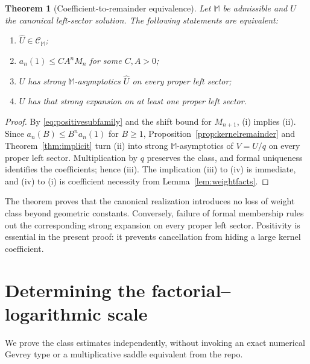 \documentclass[11pt,a4paper]{article}
\numberwithin{equation}{section}
\newtheorem{theorem}{Theorem}[section]
\theoremstyle{definition}\newtheorem{definition}[theorem]{Definition}
\theoremstyle{remark}\newtheorem{remark}[theorem]{Remark}
\newcommand{\Uhat}{\widehat U}\newcommand{\Qhat}{\widehat Q}\newcommand{\Vhat}{\widehat V}
\newcommand{\M}{\mathbb M}\newcommand{\CM}{\mathcal C_{\M}}
\begin{document}
\begin{theorem}[Coefficient-to-remainder equivalence]
\label{thm:bridge}
Let $\M$ be admissible and $U$ the canonical left-sector solution.
The following statements are equivalent:
\begin{enumerate}[label=(\roman*)]
\item $\Uhat\in\CM$;
\item $a_n(1)\le CA^nM_n$ for some $C,A>0$;
\item $U$ has strong $\M$-asymptotics $\Uhat$ on every proper left sector;
\item $U$ has that strong expansion on at least one proper left sector.
\end{enumerate}
\end{theorem}
\begin{proof}
By \eqref{eq:positivesubfamily} and the shift bound for $M_{n+1}$,
(i) implies (ii). Since $a_n(B)\le B^na_n(1)$ for $B\ge1$,
Proposition~\ref{prop:kernelremainder} and Theorem~\ref{thm:implicit}
turn (ii) into strong $\M$-asymptotics of $V=U/q$ on every proper left
sector. Multiplication by $q$ preserves the class, and formal uniqueness
identifies the coefficients; hence (iii). The implication (iii) to (iv)
is immediate, and (iv) to (i) is coefficient necessity from
Lemma~\ref{lem:weightfacts}.
\end{proof}

The theorem proves that the canonical realization introduces no loss of
weight class beyond geometric constants. Conversely, failure of formal
membership rules out the corresponding strong expansion on every proper
left sector. Positivity is essential in the present proof: it prevents
cancellation from hiding a large kernel coefficient.

\section{Determining the factorial--logarithmic scale}
\label{sec:classification}
We prove the class estimates independently, without invoking an exact
numerical Gevrey type or a multiplicative saddle equivalent from the repo.
\end{document}
